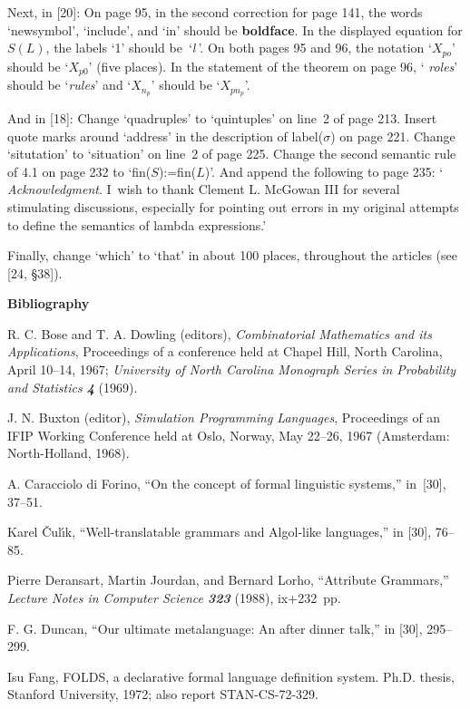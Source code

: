 Next, in 
[20]:
On page 95, in the second correction for page 141, the words
`newsymbol', `include', and `in' should be {\bf boldface}.
In the displayed equation for $S(L)$, the labels `1' should 
be~`$l\mkern1mu$'.
On both pages 95 and 96, the notation `$X_{po}$' should be `$X_{p0}$'
(five places). In the statement of the theorem on page 96, `{\it
roles\/}' should be `{\it rules\/}' and `$X_{n_p}$' should be
`$X_{pn_p}$'. 

And in 
[18]:
Change `quadruples' to `quintuples' on line~2 of page 213. Insert
quote marks around `address' in the description of label($\sigma$) on
page 221. Change `situtation' to `situation' on line~2 of page 225.
Change the second semantic  rule of 4.1 on page 232 to
`fin($S$):=fin($L$)'.  And append the following to page 235: `{\it
Acknowledgment}. I~wish to thank Clement L. McGowan III for several
stimulating discussions, especially for pointing out errors in my
original attempts to define the semantics of lambda expressions.'

Finally, change `which' to `that' in about 100 places, throughout the
articles (see
[24, {\S}38]).

\bigskip
\centerline{\bf Bibliography}

\smallskip

\bib
[1] R. C. Bose and T. A. Dowling (editors), {\sl Combinatorial
Mathematics and its Applications}, Proceedings of a conference held at
Chapel Hill, North Carolina, April 10--14, 1967; {\sl University of
North Carolina Monograph Series in Probability and Statistics\/ \bf 4}
(1969).

\bib
[2] J. N. Buxton (editor), {\sl Simulation Programming Languages},
Proceedings of an IFIP Working Conference held at Oslo, Norway, 
 May 22--26, 1967 (Amsterdam: North-Holland,
1968).

\bib
[3] A. Caracciolo di Forino, ``On the concept of formal linguistic
systems,'' in~[30], 37--51.

\bib
[4] Karel {\v C}ul\'{\i}k, ``Well-translatable grammars and
Algol-like languages,'' in
[30],
76--85.

\bib
[5] Pierre Deransart, Martin Jourdan, and Bernard Lorho, ``Attribute
Grammars,'' {\sl Lecture Notes in Computer Science\/ \bf 323} (1988),
ix+232~pp. 

\bib
[6] F. G. Duncan, ``Our ultimate metalanguage: An after
dinner talk,'' in 
[30], 295--299.

\bib
[7] Isu Fang, 
{\ninerm 
FOLDS}, a declarative formal language definition
system. Ph.D. thesis, Stanford University, 1972; also report
STAN-CS-72-329. 

